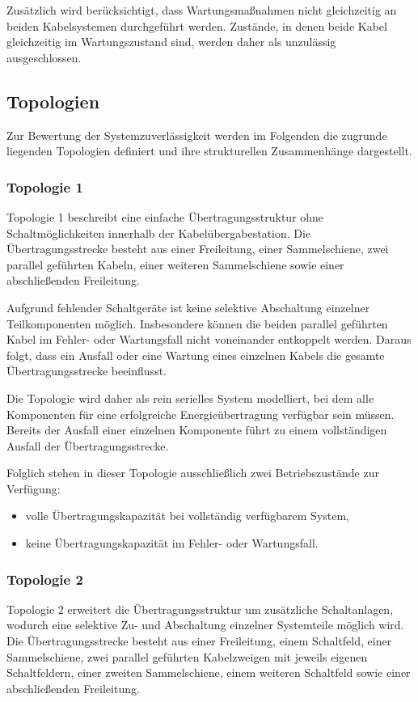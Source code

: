 \documentclass[a4paper,12pt]{article}
\begin{document}
Zusätzlich wird berücksichtigt, dass Wartungsmaßnahmen nicht gleichzeitig an
beiden Kabelsystemen durchgeführt werden. Zustände, in denen beide Kabel
gleichzeitig im Wartungszustand sind, werden daher als unzulässig
ausgeschlossen.

\subsection{Topologien}
Zur Bewertung der Systemzuverlässigkeit werden im Folgenden die zugrunde
liegenden Topologien definiert und ihre strukturellen Zusammenhänge
dargestellt.

\subsubsection{Topologie 1}

Topologie 1 beschreibt eine einfache Übertragungsstruktur ohne
Schaltmöglichkeiten innerhalb der Kabelübergabestation. Die
Übertragungsstrecke besteht aus einer Freileitung, einer Sammelschiene,
zwei parallel geführten Kabeln, einer weiteren Sammelschiene sowie einer
abschließenden Freileitung.

Aufgrund fehlender Schaltgeräte ist keine selektive Abschaltung einzelner
Teilkomponenten möglich. Insbesondere können die beiden parallel geführten
Kabel im Fehler- oder Wartungsfall nicht voneinander entkoppelt werden.
Daraus folgt, dass ein Ausfall oder eine Wartung eines einzelnen Kabels
die gesamte Übertragungsstrecke beeinflusst.

Die Topologie wird daher als rein serielles System modelliert, bei dem alle
Komponenten für eine erfolgreiche Energieübertragung verfügbar sein müssen.
Bereits der Ausfall einer einzelnen Komponente führt zu einem vollständigen
Ausfall der Übertragungsstrecke.

Folglich stehen in dieser Topologie ausschließlich zwei Betriebszustände
zur Verfügung:
\begin{itemize}
    \item volle Übertragungskapazität bei vollständig verfügbarem System,
    \item keine Übertragungskapazität im Fehler- oder Wartungsfall.
\end{itemize}

\subsubsection{Topologie 2}

Topologie 2 erweitert die Übertragungsstruktur um zusätzliche
Schaltanlagen, wodurch eine selektive Zu- und Abschaltung einzelner
Systemteile möglich wird. Die Übertragungsstrecke besteht aus einer
Freileitung, einem Schaltfeld, einer Sammelschiene, zwei parallel
geführten Kabelzweigen mit jeweils eigenen Schaltfeldern, einer zweiten
Sammelschiene, einem weiteren Schaltfeld sowie einer abschließenden
Freileitung.
\end{document}
